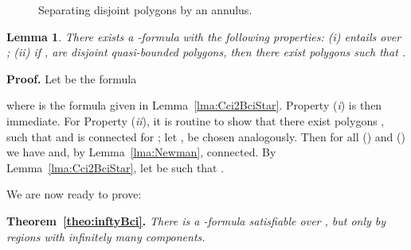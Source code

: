 \documentclass{article}
\newtheorem{lemma}[theorem]{Lemma}
\newcommand{\qedsymbol}{\ding{113}}
\newenvironment{proof}{\par\noindent\textbf{Proof.}}{\mbox{}\hfill\qedsymbol\par\bigskip}
\newenvironment{swetheorem}[1]{\par\medskip\noindent\textbf{#1.}\hspace*{0.5em}\em}{\par\smallskip}
\begin{document}
\begin{figure}[h]
\begin{center}
\end{center}
\caption{Separating disjoint polygons by an annulus.}	\label{fig:Cci2BciStar}
\end{figure}
\begin{lemma}\label{lma:Cci2Bci}
	There exists a -formula  with the following
	properties: \textup{(}i\textup{)}  entails  over ; \textup{(}ii\textup{)} if ,  are
	disjoint quasi-bounded polygons, then there exist
	polygons  such that .
\end{lemma}
\begin{proof}
Let  be the formula
	
	where  is the formula given in
	Lemma~\ref{lma:Cci2BciStar}. Property ({\em i}) is then immediate. For
	Property ({\em ii}), it is routine to show that there exist  polygons , 
	such that  and  is connected for ; let ,  be chosen analogously. Then for all  () and  () we have  and, by Lemma~\ref{lma:Newman},  connected. By Lemma~\ref{lma:Cci2BciStar}, let
	 be such that .
\end{proof}
We are now ready to prove:
\begin{swetheorem}{Theorem~\ref{theo:inftyBci}}
There is a -formula satisfiable over , but only by
regions with infinitely many components.
\end{swetheorem}
\end{document}

